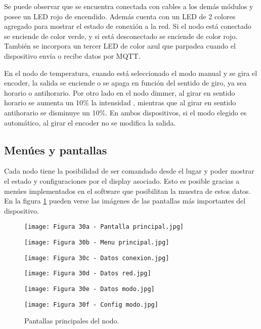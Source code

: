 Se puede observar que se encuentra conectada con cables a los demás módulos y posee un LED rojo de encendido. Además cuenta con un LED de 2 colores agregado para mostrar el estado de conexión a la red. Si el nodo está conectado se enciende de color verde, y si está desconectado se enciende de color rojo. También se incorpora un tercer LED de color azul que parpadea cuando el dispositivo envía o recibe datos por MQTT.

En el nodo de temperatura, cuando está seleccionado el modo manual y se gira el encoder, la salida se enciende o se apaga en función del sentido de giro, ya sea horario o antihorario. Por otro lado en el nodo dimmer, al girar en sentido horario se aumenta un 10\% la intensidad , mientras que al girar en sentido antihorario se disminuye un 10\%. En ambos dispositivos, si el modo elegido es automático, al girar el encoder no se modifica la salida.

\subsection{Menúes y pantallas}

Cada nodo tiene la posibilidad de ser comandado desde el lugar y poder mostrar el estado y configuraciones por el display asociado. Esto es posible gracias a menúes implementados en el software que posibilitan la muestra de estos datos. En la figura \ref{fig:30} pueden verse las imágenes de las pantallas más importantes del dispositivo.

\begin{figure}[h]
\centering
\begin{minipage}{0.32\textwidth}
  \centering
  \texttt{[image: Figura 30a - Pantalla principal.jpg]}
\end{minipage}%
\begin{minipage}{0.32\textwidth}
  \centering
  \texttt{[image: Figura 30b - Menu principal.jpg]}
\end{minipage}
\begin{minipage}{0.32\textwidth}
  \centering
  \texttt{[image: Figura 30c - Datos conexion.jpg]}
\end{minipage}
\end{figure}
\begin{figure}[h]
\centering
\begin{minipage}{0.32\textwidth}
  \centering
  \texttt{[image: Figura 30d - Datos red.jpg]}
\end{minipage}
\begin{minipage}{0.32\textwidth}
  \centering
  \texttt{[image: Figura 30e - Datos modo.jpg]}
\end{minipage}
\begin{minipage}{0.32\textwidth}
  \centering
  \texttt{[image: Figura 30f - Config modo.jpg]}
\end{minipage}
\caption[Pantallas principales]{Pantallas principales del nodo.}
\label{fig:30}
\end{figure}

